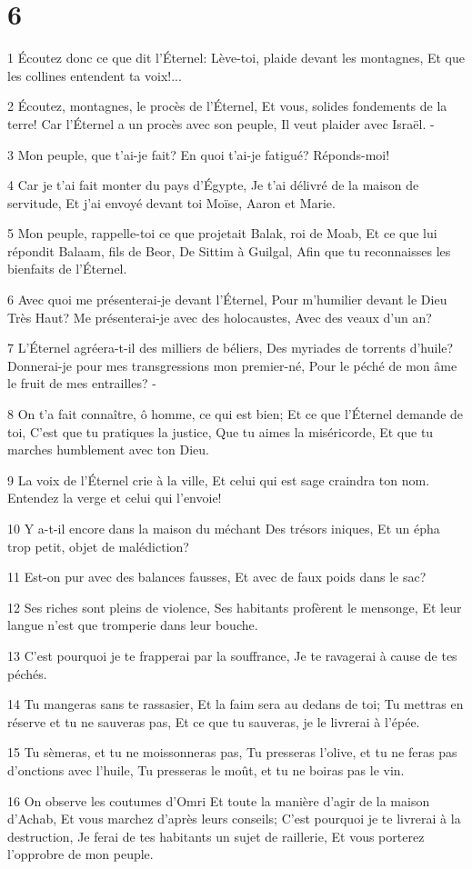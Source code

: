 \chapter{6}

\par 1 Écoutez donc ce que dit l'Éternel: Lève-toi, plaide devant les montagnes, Et que les collines entendent ta voix!...
\par 2 Écoutez, montagnes, le procès de l'Éternel, Et vous, solides fondements de la terre! Car l'Éternel a un procès avec son peuple, Il veut plaider avec Israël. -
\par 3 Mon peuple, que t'ai-je fait? En quoi t'ai-je fatigué? Réponds-moi!
\par 4 Car je t'ai fait monter du pays d'Égypte, Je t'ai délivré de la maison de servitude, Et j'ai envoyé devant toi Moïse, Aaron et Marie.
\par 5 Mon peuple, rappelle-toi ce que projetait Balak, roi de Moab, Et ce que lui répondit Balaam, fils de Beor, De Sittim à Guilgal, Afin que tu reconnaisses les bienfaits de l'Éternel.
\par 6 Avec quoi me présenterai-je devant l'Éternel, Pour m'humilier devant le Dieu Très Haut? Me présenterai-je avec des holocaustes, Avec des veaux d'un an?
\par 7 L'Éternel agréera-t-il des milliers de béliers, Des myriades de torrents d'huile? Donnerai-je pour mes transgressions mon premier-né, Pour le péché de mon âme le fruit de mes entrailles? -
\par 8 On t'a fait connaître, ô homme, ce qui est bien; Et ce que l'Éternel demande de toi, C'est que tu pratiques la justice, Que tu aimes la miséricorde, Et que tu marches humblement avec ton Dieu.
\par 9 La voix de l'Éternel crie à la ville, Et celui qui est sage craindra ton nom. Entendez la verge et celui qui l'envoie!
\par 10 Y a-t-il encore dans la maison du méchant Des trésors iniques, Et un épha trop petit, objet de malédiction?
\par 11 Est-on pur avec des balances fausses, Et avec de faux poids dans le sac?
\par 12 Ses riches sont pleins de violence, Ses habitants profèrent le mensonge, Et leur langue n'est que tromperie dans leur bouche.
\par 13 C'est pourquoi je te frapperai par la souffrance, Je te ravagerai à cause de tes péchés.
\par 14 Tu mangeras sans te rassasier, Et la faim sera au dedans de toi; Tu mettras en réserve et tu ne sauveras pas, Et ce que tu sauveras, je le livrerai à l'épée.
\par 15 Tu sèmeras, et tu ne moissonneras pas, Tu presseras l'olive, et tu ne feras pas d'onctions avec l'huile, Tu presseras le moût, et tu ne boiras pas le vin.
\par 16 On observe les coutumes d'Omri Et toute la manière d'agir de la maison d'Achab, Et vous marchez d'après leurs conseils; C'est pourquoi je te livrerai à la destruction, Je ferai de tes habitants un sujet de raillerie, Et vous porterez l'opprobre de mon peuple.

